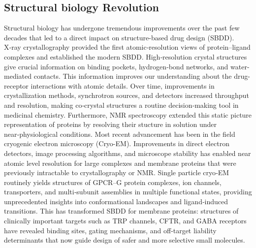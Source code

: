 \documentclass[12pt, a4paper]{article}
\begin{document}
\subsection{Structural biology Revolution}
Structural biology has undergone tremendous improvements over the past few decades that led to a direct impact on structure-based drug design (SBDD)\cite{CH1_4}.  X‑ray crystallography provided the first atomic‑resolution views of protein–ligand complexes and established the modern SBDD. High‑resolution crystal structures give crucial information on binding pockets, hydrogen‑bond networks, and water-mediated contacts. This information improves our understanding about the drug-receptor interactions with atomic details. Over time, improvements in crystallization methods, synchrotron sources, and detectors increased throughput and resolution, making co‑crystal structures a routine decision‑making tool in medicinal chemistry. Furthermore,  NMR spectroscopy extended this static picture representation of proteins by resolving their stucture in solution under near‑physiological conditions\cite{CH1_4}.  
Most recent advancement has been in the field cryogenic electron microscopy (Cryo-EM). Improvements in direct electron detectors, image processing algorithms, and microscope stability has enabled near atomic level resolution for large complexes and membrane proteins that were previously intractable to crystallography or NMR. Single particle cryo‑EM routinely yields structures of GPCR–G protein complexes, ion channels, transporters, and multi‑subunit assemblies in multiple functional states, providing unprecedented insights into conformational landscapes and ligand‑induced transitions. This has transformed SBDD for membrane proteins: structures of clinically important targets such as TRP channels, CFTR, and GABA receptors have revealed binding sites, gating mechanisms, and off‑target liability determinants that now guide design of safer and more selective small molecules\cite{CH1_5}.
\end{document}
